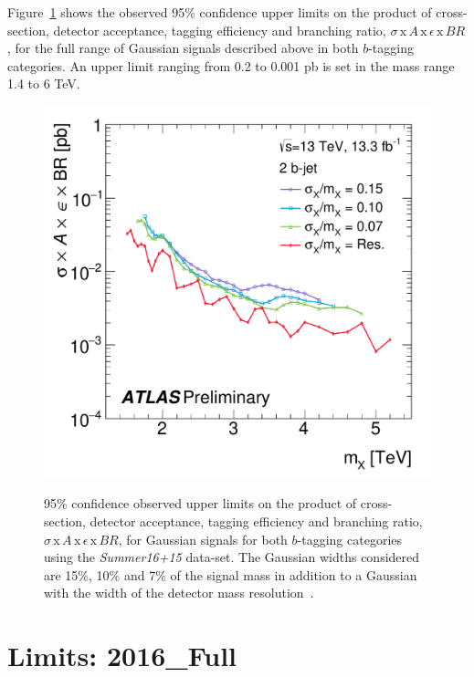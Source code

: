 Figure~\ref{fig:lim-summer_gauss} shows the observed 95\% confidence upper limits
on the product of cross-section, detector acceptance, tagging efficiency and branching ratio,
$\sigma\,\text{x}\,\mathit{A}\,\text{x}\,\epsilon\,\text{x}\,\mathit{BR}$,
for the full range of Gaussian signals described above in both $b$-tagging categories.
An upper limit ranging from 
0.2 to 0.001 pb is set in the mass range 1.4 to 6 TeV.

\begin{figure}[!ht]
  \begin{center}
    \captionsetup[subfigure]{aboveskip=0pt,justification=centering}
         {\includegraphics[width=0.47\linewidth, angle=0]{figs/Dibjet/ICHEP/lim-summer_gauss_bb.pdf}}
  \end{center}
  \caption[95\% confidence observed upper limits
    on the product of cross-section, detector acceptance, tagging efficiency and branching ratio,
    $\sigma\,\text{x}\,\mathit{A}\,\text{x}\,\epsilon\,\text{x}\,\mathit{BR}$,
    for Gaussian signals for both $b$-tagging categories using the \textit{Summer16+15} data-set.
    The Gaussian widths considered are 15\%, 10\% and 7\% of the signal mass
    in addition to a Gaussian with the width of the detector mass resolution.]
  {95\% confidence observed upper limits
    on the product of cross-section, detector acceptance, tagging efficiency and branching ratio,
    $\sigma\,\text{x}\,\mathit{A}\,\text{x}\,\epsilon\,\text{x}\,\mathit{BR}$,
    for Gaussian signals for both $b$-tagging categories using the \textit{Summer16+15} data-set.
    The Gaussian widths considered are 15\%, 10\% and 7\% of the signal mass
    in addition to a Gaussian with the width of the detector mass resolution~\cite{dibjet-ichep_conf}.
  }
  \label{fig:lim-summer_gauss}
\end{figure}


\section{Limits: 2016\_Full}
\label{sec:lim-full}
